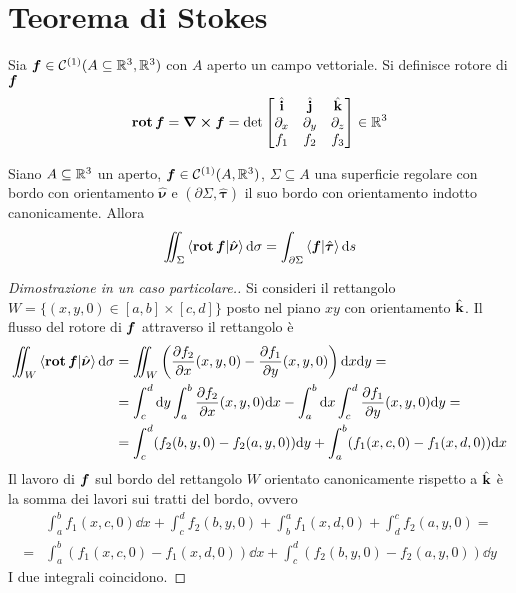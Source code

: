 \section{Teorema di Stokes}

\begin{definition}
	[Rotore]
	Sia $\bm f\in \mathcal{C}^{(1)}(A\subseteq \mathbb{R}^3,\mathbb{R}^3)$ con $A$ aperto un campo vettoriale. Si definisce rotore di $\bm f$
	$$
		\operatorname{\vb{rot}} \bm f=\curl \bm f=\det
		\begin{bmatrix}
			\hat{\vb{i}} & \hat{\vb{j}} & \hat{\vb{k}}\\
			\partial_x & \partial_y & \partial_z\\
			f_1 & f_2 & f_3
		\end{bmatrix}
		\in \mathbb{R}^3
	$$
\end{definition}

\begin{theorem}
	Siano $A \subseteq \mathbb{R}^3$ un aperto, $\bm f \in \mathcal{C}^{(1)}(A,\mathbb{R}^3)$, $\Sigma \subseteq A$ una superficie regolare con bordo con orientamento $\hat{\bm \nu}$ e $(\partial \Sigma,\hat{\bm \tau})$ il suo bordo con orientamento indotto canonicamente. Allora
	$$
		\iint_\Sigma \ip{\rot \vecf}{\hat{\bm \nu}}\dd \sigma = \int_{\partial\Sigma}\ip{\vecf}{\hat{\bm \tau}}\dd s
	$$
\end{theorem}

\begin{proof}
	[Dimostrazione in un caso particolare.]
	Si consideri il rettangolo $W=\{(x,y,0)\in[a,b]\times[c,d]\}$ posto nel piano $xy$ con orientamento $\hat{\vb{k}}$. Il flusso del rotore di $\bm f$ attraverso il rettangolo è
	\begin{align*}
		\iint_W \ip{\rot \vecf}{\hat{\bm \nu}}\dd \sigma
		&= \iint_{W}\left(\frac{\partial f_2}{\partial x}(x,y,0)-\frac{\partial f_1}{\partial y}(x,y,0)\right)\dd x \dd y=\\
		&=\int_c^d \dd y\int_a^b\frac{\partial f_2}{\partial x}(x,y,0)\dd x-
		\int_a^b\dd x\int_c^d\frac{\partial f_1}{\partial y}(x,y,0)\dd y=\\
		&=\int_c^d(f_2(b,y,0)-f_2(a,y,0))\dd y+\int_a^b(f_1(x,c,0)-f_1(x,d,0))\dd x
	\end{align*}
	Il lavoro di $\bm f$ sul bordo del rettangolo $W$ orientato canonicamente rispetto a $\hat{\vb{k}}$ è la somma dei lavori sui tratti del bordo, ovvero
	\begin{align*}
		&\int_a^bf_1(x,c,0)\dd x+\int_c^df_2(b,y,0)+\int_b^af_1(x,d,0)+\int_d^cf_2(a,y,0)=\\
		=&\int_a^b(f_1(x,c,0)-f_1(x,d,0))\dd x+\int_c^d(f_2(b,y,0)-f_2(a,y,0))\dd y
	\end{align*}
	I due integrali coincidono.
\end{proof}

